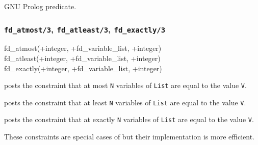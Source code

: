 \begin{PlErrors}






\end{PlErrors}

\Portability

GNU Prolog predicate.

\subsubsection{\texttt{fd\_atmost/3},
\texttt{fd\_atleast/3},
\texttt{fd\_exactly/3}}

\begin{TemplatesOneCol}
fd\_atmost(+integer, +fd\_variable\_list, +integer)\\
fd\_atleast(+integer, +fd\_variable\_list, +integer)\\
fd\_exactly(+integer, +fd\_variable\_list, +integer)

\end{TemplatesOneCol}

\Description

 posts the constraint that at most \texttt{N}
variables of \texttt{List} are equal to the value \texttt{V}.

 posts the constraint that at least
\texttt{N} variables of \texttt{List} are equal to the value \texttt{V}.

 posts the constraint that at exactly
\texttt{N} variables of \texttt{List} are equal to the value \texttt{V}.

These constraints are special cases of 
 but their implementation is more efficient.

